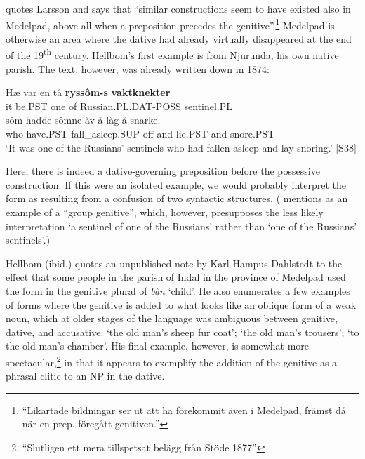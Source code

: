 \citet[126]{Hellbom1961} quotes Larsson and says that “similar constructions seem to have existed also in Medelpad, above all when a preposition precedes the genitive”.\footnote{ “Likartade bildningar ser ut att ha förekommit även i Medelpad, främst då när en prep. föregått genitiven.”} Medelpad is otherwise an area where the dative had already virtually disappeared at the end of the 19\textsuperscript{th} century. Hellbom’s first example is from Njurunda, his own native parish. The text, however, was already written down in 1874:

\ea\label{}
\gll Hæ  var  en  tå  \textbf{ryssôm-s} \textbf{vaktknekter}\\
it  be.PST  one  of  Russian.PL.DAT-POSS  sentinel.PL\\
\gll sôm  hadde  sômne  åv  å  låg  å  snarke.\\
who  have.PST  fall\_asleep.SUP  off  and  lie.PST  and  snore.PST\\
\glt  ‘It was one of the Russians’ sentinels who had fallen asleep and lay snoring.’ [S38]
\z

Here, there is indeed a dative-governing preposition before the possessive construction. If this were an isolated example, we would probably interpret the form  as resulting from a confusion of two syntactic structures. (\citet[38]{Delsing2003a} mentions  as an example of a “group genitive”, which, however, presupposes the less likely interpretation ‘a sentinel of one of the Russians’ rather than ‘one of the Russians’ sentinels’.) 

Hellbom (ibid.) quotes an unpublished note by Karl-Hampus Dahlstedt to the effect that some people in the parish of Indal in the province of Medelpad used the form  in the genitive plural of \textit{bån} ‘child’. He also enumerates a few examples of forms where the genitive is added to what looks like an oblique form of a weak noun, which at older stages of the language was ambiguous between genitive, dative, and accusative:  ‘the old man’s sheep fur coat’;  ‘the old man’s trousers’;  ‘to the old man’s chamber’. His final example, however, is somewhat more spectacular,\footnote{ “Slutligen ett mera tillspetsat belägg från Stöde 1877”} in that it appears to exemplify the addition of the genitive as a phrasal clitic to an NP in the dative. 

